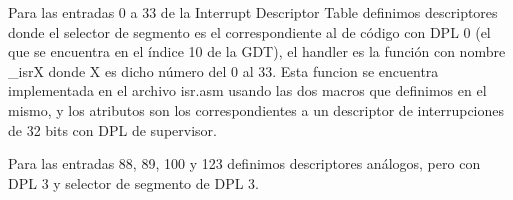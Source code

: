 \par Para las entradas 0 a 33 de la Interrupt Descriptor Table definimos descriptores donde el selector de segmento es el correspondiente al de código con DPL 0 (el que se encuentra en el índice 10 de la GDT), el handler es la función con nombre _isrX donde X es dicho número del 0 al 33. Esta funcion se encuentra implementada en el archivo isr.asm usando las dos macros que definimos en el mismo, y los atributos son los correspondientes a un descriptor de interrupciones de 32 bits con DPL de supervisor.
\par Para las entradas 88, 89, 100 y 123 definimos descriptores análogos, pero con DPL 3 y selector de segmento de DPL 3.
